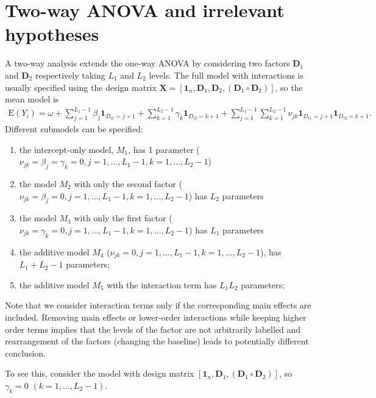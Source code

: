 \documentclass[]{book}
\providecommand{\tightlist}{%
  \setlength{\itemsep}{0pt}\setlength{\parskip}{0pt}}
\theoremstyle{definition}
\theoremstyle{definition}
\theoremstyle{definition}
\theoremstyle{remark}
\begin{document}
\hypertarget{two-way-anova-and-irrelevant-hypotheses}{%
\section{Two-way ANOVA and irrelevant
hypotheses}\label{two-way-anova-and-irrelevant-hypotheses}}

A two-way analysis extends the one-way ANOVA by considering two factors
\(\mathbf{D}_1\) and \(\mathbf{D}_2\) respectively taking \(L_1\) and
\(L_2\) levels. The full model with interactions is usually specified
using the design matrix
\(\mathbf{X} = [\mathbf{1}_n, \mathbf{D}_{1}, \mathbf{D}_2, (\mathbf{D}_1\circ \mathbf{D}_2) ]\),
so the mean model is \begin{align*}
  \mathrm{E}(Y_{i})= \omega + \sum_{j=1}^{L_1-1} \beta_j{\mathbf 1}_{D_{i1}=j+1} + \sum_{k=1}^{L_2-1}
  \gamma_k{\mathbf 1}_{D_{i2}=k+1} + \sum_{j=1}^{L_1-1}\sum_{k=1}^{L_2-1} \nu_{jk}{\mathbf 1}_{D_{i1}=j+1}{\mathbf 1}_{D_{i2}=k+1}.
 \end{align*} Different submodels can be specified:

\begin{enumerate}
\def\labelenumi{\roman{enumi}.}
\tightlist
\item
  the intercept-only model, \(M_1\), has 1 parameter
  (\(\nu_{jk}=\beta_j=\gamma_k=0, j=1, \ldots, L_1-1, k = 1, \ldots, L_2-1\))
\item
  the model \(M_2\) with only the second factor
  (\(\nu_{jk}=\beta_j=0, j=1, \ldots, L_1-1, k = 1, \ldots, L_2-1\)) has
  \(L_2\) parameters
\item
  the model \(M_3\) with only the first factor
  (\(\nu_{jk}=\gamma_k=0, j=1, \ldots, L_1-1, k = 1, \ldots, L_2-1\))
  has \(L_1\) parameters
\item
  the additive model \(M_4\)
  (\(\nu_{jk}=0, j=1, \ldots, L_1-1, k = 1, \ldots, L_2-1\)), has
  \(L_1+L_2-1\) parameters;
\item
  the additive model \(M_5\) with the interaction term has \(L_1L_2\)
  parameters;
\end{enumerate}

Note that we consider interaction terms only if the corresponding main
effects are included. Removing main effects or lower-order interactions
while keeping higher order terms implies that the levels of the factor
are not arbitrarily labelled and rearrangement of the factors (changing
the baseline) leads to potentially different conclusion.

To see this, consider the model with design matrix
\([\mathbf{1}_n, \mathbf{D}_{1}, (\mathbf{D}_1\circ \mathbf{D}_2)]\), so
\(\gamma_k=0\) \((k = 1, \ldots, L_2-1)\).
\end{document}
